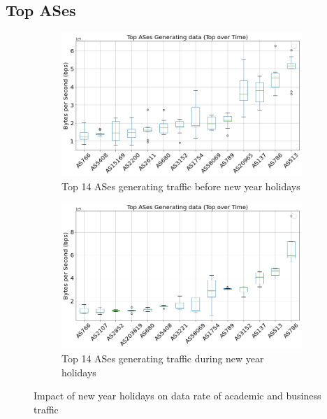 \documentclass[10pt, journal, letterpaper]{IEEEtran}
\newcommand\figSzeMahdi{0.8}
\begin{document}
\subsection{Top ASes}
\begin{figure}[hbt!]
    \centering
    \begin{subfigure}{\figSzeMahdi\columnwidth}
          \centering
          \includegraphics[width=\columnwidth]{img/BCH2_top14AS_generating_bps.png}
          \caption{Top 14 ASes generating traffic before new year holidays}
          \label{fig:BCH2_topAS_gen_bps}
    \end{subfigure}
    \begin{subfigure}{\figSzeMahdi\columnwidth}
          \centering
          \includegraphics[width=\columnwidth]{img/CH2_top14AS_generating_bps.png}
          \caption{Top 14 ASes generating traffic during new year holidays}
          \label{fig:CH2_topAS_gen_bps}
    \end{subfigure}
    \caption{Impact of new year holidays on data rate of academic and business traffic}
    \label{fig:topAS_gen_BCH_CH}
\end{figure}
\end{document}
